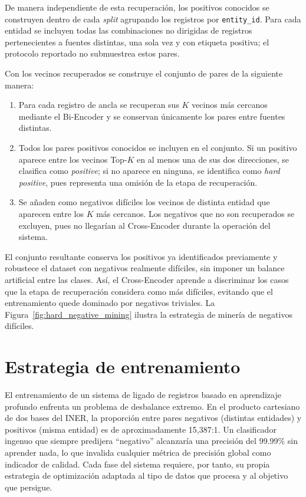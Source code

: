 De manera independiente de esta recuperación, los positivos conocidos se construyen dentro de cada \textit{split} agrupando los registros por \texttt{entity\_id}. Para cada entidad se incluyen todas las combinaciones no dirigidas de registros pertenecientes a fuentes distintas, una sola vez y con etiqueta positiva; el protocolo reportado no submuestrea estos pares.

Con los vecinos recuperados se construye el conjunto de pares de la siguiente manera:

\begin{enumerate}
\item Para cada registro de ancla se recuperan sus $K$ vecinos más cercanos mediante el Bi-Encoder y se conservan únicamente los pares entre fuentes distintas.
\item Todos los pares positivos conocidos se incluyen en el conjunto. Si un positivo aparece entre los vecinos Top-$K$ en al menos una de sus dos direcciones, se clasifica como \textit{positive}; si no aparece en ninguna, se identifica como \textit{hard positive}, pues representa una omisión de la etapa de recuperación.
\item Se añaden como negativos difíciles los vecinos de distinta entidad que aparecen entre los $K$ más cercanos. Los negativos que no son recuperados se excluyen, pues no llegarían al Cross-Encoder durante la operación del sistema.
\end{enumerate}

El conjunto resultante conserva los positivos ya identificados previamente y robustece el dataset con negativos realmente difíciles, sin imponer un balance artificial entre las clases. Así, el Cross-Encoder aprende a discriminar los casos que la etapa de recuperación considera como más difíciles, evitando que el entrenamiento quede dominado por negativos triviales. La Figura~\ref{fig:hard_negative_mining} ilustra la estrategia de minería de negativos difíciles.



\section{Estrategia de entrenamiento}
\label{sec:entrenamiento}

El entrenamiento de un sistema de ligado de registros basado en aprendizaje profundo enfrenta un problema de desbalance extremo. En el producto cartesiano de dos bases del INER, la proporción entre pares negativos (distintas entidades) y positivos (misma entidad) es de aproximadamente 15,387:1. Un clasificador ingenuo que siempre predijera ``negativo'' alcanzaría una precisión del 99.99\% sin aprender nada, lo que invalida cualquier métrica de precisión global como indicador de calidad. Cada fase del sistema requiere, por tanto, su propia estrategia de optimización adaptada al tipo de datos que procesa y al objetivo que persigue.

